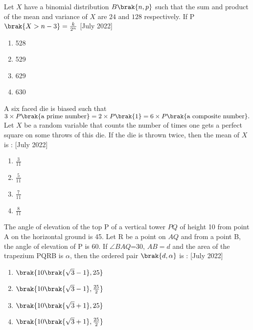 

\iffalse
  \title{2022}
  \author{ai24btech11005}
  \section{mcq-single}
\fi


    \item Let $X$ have  a binomial distribution $B\brak{n,p}$ such that the sum and product of the mean and variance of $X$  are $24$ and $128$ respectively. If P$\brak{X>n-3}=\frac{k}{2^n}$
\hfill{[July 2022]}
        \begin{multicols}{4}
            \begin{enumerate}
                \item 528
                \item 529
                \item 629
                \item 630
            \end{enumerate}
        \end{multicols}

    \item A six faced die is biased such that $3\times P\brak{\text{a prime number}}=2\times P\brak{1}=6\times P\brak{\text{a composite number}}.$ Let $X$ be a random variable that counts the number of times one gets a perfect square on some throws of this die. If the die is thrown twice, then the mean of $X$ is :
\hfill{[July 2022]}
		\begin{multicols}{1}
			\begin{enumerate}
				\item $\frac{3}{11}$
				\item $\frac{5}{11}$
				\item $\frac{7}{11}$
				\item $\frac{8}{11}$
			\end{enumerate}
		\end{multicols}

    \item The angle of elevation of the top P of a vertical tower $PQ$ of height 10 from point A on the horizontal ground is 45\textdegree. Let R be a point on $AQ$ and from a point B, the angle of elevation of P is 60\textdegree. If $\angle BAQ$=30\textdegree, $AB=d$ and the area of the trapezium PQRB is $\alpha$, then the ordered pair $\brak{d,\alpha}$ is :
 \hfill{[July 2022]}
        \begin{multicols}{1}
            \begin{enumerate}
                \item $\brak{10\brak{\sqrt{3}-1},25}$
                \item $\brak{10\brak{\sqrt{3}-1},\frac{25}{2}}$
                \item $\brak{10\brak{\sqrt{3}+1},25}$
                \item $\brak{10\brak{\sqrt{3}+1},\frac{25}{2}}$
            \end{enumerate}
        \end{multicols}

